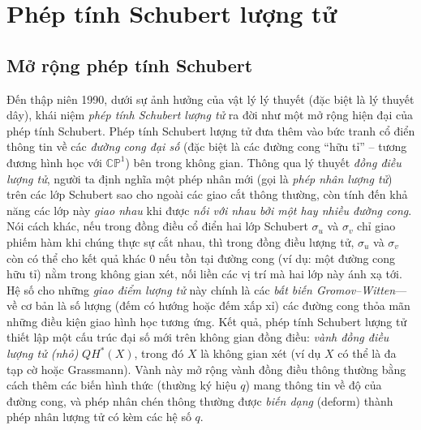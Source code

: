 \section{Phép tính Schubert lượng tử}
\subsection{Mở rộng phép tính Schubert}
Đến thập niên 1990, dưới sự ảnh hưởng của vật lý lý thuyết (đặc biệt là lý thuyết dây), khái niệm \textit{phép tính Schubert lượng tử} ra đời như một mở rộng hiện đại của phép tính Schubert. Phép tính Schubert lượng tử đưa thêm vào bức tranh cổ điển thông tin về các \textit{đường cong đại số} (đặc biệt là các đường cong ``hữu tỉ'' – tương đương hình học với $\mathbb{CP}^1$) bên trong không gian. Thông qua lý thuyết \textit{đồng điều lượng tử}, người ta định nghĩa một phép nhân mới (gọi là \textit{phép nhân lượng tử}) trên các lớp Schubert sao cho ngoài các giao cắt thông thường, còn tính đến khả năng các lớp này \textit{giao nhau} khi được \textit{nối với nhau bởi một hay nhiều đường cong}. Nói cách khác, nếu trong đồng điều cổ điển hai lớp Schubert $\sigma_u$ và $\sigma_v$ chỉ giao phiếm hàm khi chúng thực sự cắt nhau, thì trong đồng điều lượng tử, $\sigma_u$ và $\sigma_v$ còn có thể cho kết quả khác $0$ nếu tồn tại đường cong (ví dụ: một đường cong hữu tỉ) nằm trong không gian xét, nối liền các vị trí mà hai lớp này ánh xạ tới. Hệ số cho những \textit{giao điểm lượng tử} này chính là các \textit{bất biến Gromov–Witten}---về cơ bản là số lượng (đếm có hướng hoặc đếm xấp xỉ) các đường cong thỏa mãn những điều kiện giao hình học tương ứng. Kết quả, phép tính Schubert lượng tử thiết lập một cấu trúc đại số mới trên không gian đồng điều: \textit{vành đồng điều lượng tử (nhỏ)} $QH^*(X)$, trong đó $X$ là không gian xét (ví dụ $X$ có thể là đa tạp cờ hoặc Grassmann). Vành này mở rộng vành đồng điều thông thường bằng cách thêm các biến hình thức (thường ký hiệu $q$) mang thông tin về độ của đường cong, và phép nhân chén thông thường được \textit{biến dạng} (deform) thành phép nhân lượng tử có kèm các hệ số $q$.

